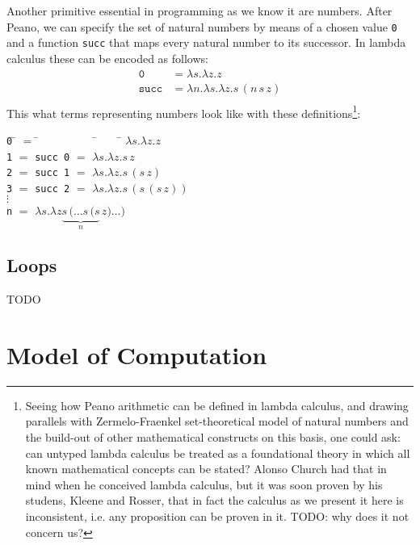 \documentclass[11pt,twoside,a4paper]{article} %
\newcommand{\sym}[1]{\texttt{#1}}
\newcommand{\msym}[1]{\mathtt{#1}}
\begin{document}
Another primitive essential in programming as we know it are numbers. After
Peano, we can specify the set of natural numbers by means of a chosen value
\sym{0} and a function \sym{succ} that maps every natural number to
its successor. In lambda calculus these can be encoded as follows:
\begin{align*}
\msym{0}    &= \lambda s.\lambda z.z \\
\msym{succ} &= \lambda n.\lambda s.\lambda z.s\,(n\,s\,z) \\
\end{align*}
This what terms representing numbers look like with these 
definitions\footnote{Seeing how Peano arithmetic can be defined in lambda calculus,
and drawing parallels with Zermelo-Fraenkel set-theoretical model of
natural numbers and the build-out of other mathematical constructs on this
basis, one could ask: can untyped lambda calculus be treated as a foundational
theory in which all known mathematical concepts can be stated? Alonso Church had 
that in mind when he conceived lambda calculus, but it was soon proven by his 
studens, Kleene and Rosser\cite{wkrp}, that in fact the calculus as we present it here is 
inconsistent, i.e. any proposition can be proven in it. TODO: why does it not
concern us?}:
\begin{center}
\parbox{0cm}{
\begin{tabbing}
\sym{0} \= $=$ \= ~~~~~~~~~ \= ~~~ \= $\lambda s.\lambda z.z$    \\
\sym{1} \> $=$ \> \sym{succ 0} \> $=$ \> $\lambda s.\lambda z.s\,z$ \\
\sym{2} \> $=$ \> \sym{succ 1} \> $=$ \> $\lambda s.\lambda z.s\,(s\,z)$ \\
\sym{3} \> $=$ \> \sym{succ 2} \> $=$ \> $\lambda s.\lambda z.s\,(s\,(s\,z))$ \\
$\vdots$ \\
\sym{n} \> $=$ \> \> \> $\lambda s.\lambda z\underbrace{s\,(\dots s\,(s}_n\,z)\dots)$
\\
\end{tabbing}}
\end{center}

\subsection{Loops}

TODO

\section{Model of Computation}
\end{document}
